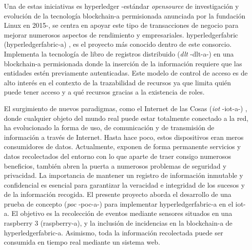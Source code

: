 \documentclass[12pt,a4paper, twoside]{report}
\begin{document}
	Una de estas iniciativas es \gls{hyperledger}
        \cite{hyperledger:url} -estándar \textit{\gls{opensource}} de
        investigación y evolución de la tecnología \gls{blockchain-a}
        permisionada anunciada por la fundación Linux en 2015-, se
        centra en apoyar este tipo de transacciones de negocio para
        mejorar numerosos aspectos de rendimiento y
        empresariales. \gls{hyperledgerfabric}
        (\gls{hyperledgerfabric-a}) \cite{hyperledgerfabric:url}, es
        el proyecto más conocido dentro de este consorcio. Implementa
        la tecnología de libro de registros distribuido
        (\textit{\gls{dlt}} -\gls{dlt-a}-) \cite{wattenhofer:DLT} en
        una \gls{blockchain-a} permisionada donde la inserción de la
        información requiere que las entidades estén previamente
        autenticadas. Este modelo de control de acceso es de alto
        interés en el contexto de la trazabilidad de recursos ya que
        limita quién puede tener acceso y a qué recursos gracias a la
        existencia de roles.
		
	El surgimiento de nuevos paradigmas, como el Internet de las
        Cosas (\textit{\gls{iot}} -\gls{iot-a}-)
        \cite{christidis:2016:bsciot}, \cite{dorri:2017:TOBI} donde
        cualquier objeto del mundo real puede estar totalmente
        conectado a la red, ha evolucionado la forma de uso, de
        comunicación y de transmisión de información a través de
        Internet. Hasta hace poco, estos dispositivos eran meros
        consumidores de datos. Actualmente, exponen de forma
        permanente servicios y datos recolectados del entorno con lo
        que aparte de traer consigo numerosos beneficios, también
        abren la puerta a numerosos problemas de seguridad y
        privacidad. La importancia de mantener un registro de
        información inmutable y confidencial es esencial para
        garantizar la veracidad e integridad de los sucesos y de la
        información recogida. El presente proyecto aborda el
        desarrollo de una prueba de concepto (\textit{\gls{poc}}
        -\gls{poc-a}-) para implementar \gls{hyperledgerfabric-a} en
        el \gls{iot-a}. El objetivo es la recolección de eventos
        mediante sensores situados en una \gls{raspberry} 3
        (\gls{raspberry-a}), y la inclusión de incidencias en la
        \gls{blockchain-a} de \gls{hyperledgerfabric-a}. Asimismo,
        toda la información recolectada puede ser consumida en tiempo
        real mediante un sistema web.
	
	\newpage	
	
\end{document}
